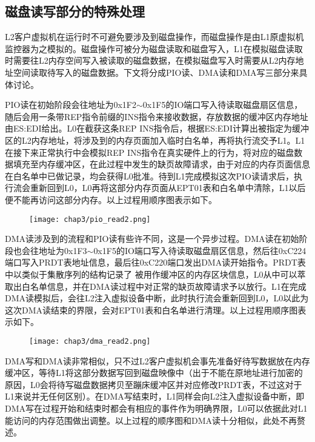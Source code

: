 \subsection{磁盘读写部分的特殊处理}

L2客户虚拟机在运行时不可避免要涉及到磁盘操作，而磁盘操作是由L1原虚拟机监控器为之模拟的。磁盘操作可被分为磁盘读取和磁盘写入，L1在模拟磁盘读取时需要往L2内存空间写入被读取的磁盘数据，在模拟磁盘写入时需要从L2内存地址空间读取待写入的磁盘数据。下文将分成PIO读、DMA读和DMA写三部分来具体讨论。

PIO读在初始阶段会往地址为0x1F2$\sim$0x1F5的IO端口写入待读取磁盘扇区信息，随后会用一条带REP指令前缀的INS指令来接收数据，存放数据的缓冲区内存地址由ES:EDI给出。L0在截获这条REP INS指令后，根据ES:EDI计算出被指定为缓冲区的L2内存地址，将涉及到的内存页面加入临时白名单，再将执行流交予L1。L1在接下来正常执行中会模拟REP INS指令在真实硬件上的行为，将对应的磁盘数据填充至内存缓冲区，在此过程中发生的缺页故障请求，由于对应的内存页面信息在白名单中已做记录，均会获得L0批准。待到L1完成模拟这次PIO读请求后，执行流会重新回到L0，L0再将这部分内存页面从EPT01表和白名单中清除，L1以后便不能再访问这部分内存。以上过程用顺序图表示如下。

\begin{figure}[!htbp]
  \centering
  \texttt{[image: chap3/pio\_read2.png]}
\end{figure}

DMA读涉及到的流程和PIO读有些许不同，这是一个异步过程。DMA读在初始阶段也会往地址为0x1F3$\sim$0x1F5的IO端口写入待读取磁盘扇区信息，然后往0xC224端口写入PRDT表地址信息，最后往0xC220端口发出DMA读开始指令。PRDT表中以类似于集散序列的结构记录了
被用作缓冲区的内存区块信息，L0从中可以萃取出白名单信息，并在DMA读过程中对正常的缺页故障请求予以放行。L1在完成DMA读模拟后，会往L2注入虚拟设备中断，此时执行流会重新回到L0，L0以此为这次DMA读结束的界限，会对EPT01表和白名单进行清理。以上过程用顺序图表示如下。

\begin{figure}[!htbp]
  \centering
  \texttt{[image: chap3/dma\_read2.png]}
\end{figure}

DMA写和DMA读非常相似，只不过L2客户虚拟机会事先准备好待写数据放在内存缓冲区，等待L1将这部分数据写回到磁盘映像中（出于不能在原地址进行加密的原因，L0会将待写磁盘数据拷贝至蹦床缓冲区并对应修改PRDT表，不过这对于L1来说并无任何区别）。在DMA写结束时，L1同样会向L2注入虚拟设备中断，即DMA写在过程开始和结束时都会有相应的事件作为明确界限，L0可以依据此对L1能访问的内存范围做出调整。以上过程的顺序图和DMA读十分相似，此处不再赘述。

